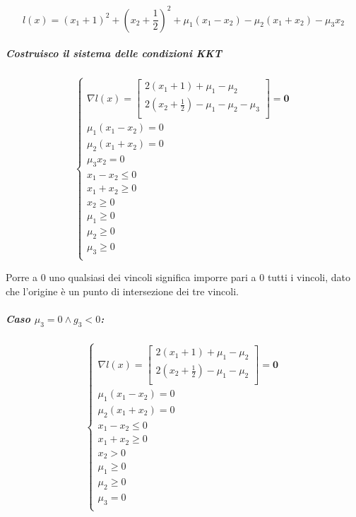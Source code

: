 \documentclass[\main/main.tex]{subfiles}
\begin{document}
\[
  l(x) = (x_1+1)^2 + (x_2 + \frac{1}{2})^2 + \mu_1(x_1 - x_2) - \mu_2(x_1 + x_2) - \mu_3x_2
\]

\subparagraph*{Costruisco il sistema delle condizioni KKT}
\[
  \begin{cases}
    \nabla l(x) = \begin{bmatrix}
      2(x_1+1) + \mu_1 - \mu_2                   \\
      2(x_2+\frac{1}{2}) - \mu_1 - \mu_2 - \mu_3 \\
    \end{bmatrix} = \bm{0} \\
    \mu_1(x_1 - x_2) = 0                             \\
    \mu_2(x_1 + x_2) = 0                             \\
    \mu_3x_2 = 0                                     \\
    x_1 - x_2 \leq 0                                 \\
    x_1 + x_2 \geq 0                                 \\
    x_2 \geq 0                                       \\
    \mu_1 \geq 0                                     \\
    \mu_2 \geq 0                                     \\
    \mu_3 \geq 0                                     \\
  \end{cases}
\]

Porre a $0$ uno qualsiasi dei vincoli significa imporre pari a $0$ tutti i vincoli, dato che l'origine è un punto di intersezione dei tre vincoli.

\subparagraph*{Caso $\mu_3 = 0 \land g_3 < 0$:}

\[
  \begin{cases}
    \nabla l(x) = \begin{bmatrix}
      2(x_1+1) + \mu_1 - \mu_2           \\
      2(x_2+\frac{1}{2}) - \mu_1 - \mu_2 \\
    \end{bmatrix} = \bm{0} \\
    \mu_1(x_1 - x_2) = 0                              \\
    \mu_2(x_1 + x_2) = 0                              \\
    x_1 - x_2 \leq 0                                  \\
    x_1 + x_2 \geq 0                                  \\
    x_2 > 0                                           \\
    \mu_1 \geq 0                                      \\
    \mu_2 \geq 0                                      \\
    \mu_3 = 0                                         \\
  \end{cases}
\]
\end{document}
